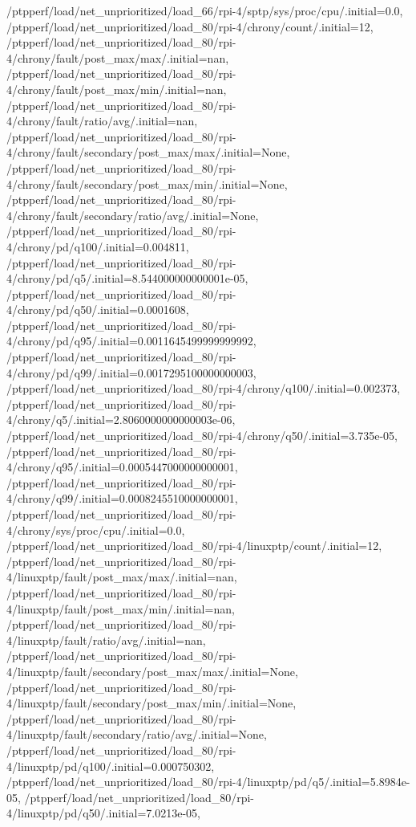 {    /ptpperf/load/net_unprioritized/load_66/rpi-4/sptp/sys/proc/cpu/.initial=0.0,
    /ptpperf/load/net_unprioritized/load_80/rpi-4/chrony/count/.initial=12,
    /ptpperf/load/net_unprioritized/load_80/rpi-4/chrony/fault/post_max/max/.initial=nan,
    /ptpperf/load/net_unprioritized/load_80/rpi-4/chrony/fault/post_max/min/.initial=nan,
    /ptpperf/load/net_unprioritized/load_80/rpi-4/chrony/fault/ratio/avg/.initial=nan,
    /ptpperf/load/net_unprioritized/load_80/rpi-4/chrony/fault/secondary/post_max/max/.initial=None,
    /ptpperf/load/net_unprioritized/load_80/rpi-4/chrony/fault/secondary/post_max/min/.initial=None,
    /ptpperf/load/net_unprioritized/load_80/rpi-4/chrony/fault/secondary/ratio/avg/.initial=None,
    /ptpperf/load/net_unprioritized/load_80/rpi-4/chrony/pd/q100/.initial=0.004811,
    /ptpperf/load/net_unprioritized/load_80/rpi-4/chrony/pd/q5/.initial=8.544000000000001e-05,
    /ptpperf/load/net_unprioritized/load_80/rpi-4/chrony/pd/q50/.initial=0.0001608,
    /ptpperf/load/net_unprioritized/load_80/rpi-4/chrony/pd/q95/.initial=0.0011645499999999992,
    /ptpperf/load/net_unprioritized/load_80/rpi-4/chrony/pd/q99/.initial=0.0017295100000000003,
    /ptpperf/load/net_unprioritized/load_80/rpi-4/chrony/q100/.initial=0.002373,
    /ptpperf/load/net_unprioritized/load_80/rpi-4/chrony/q5/.initial=2.8060000000000003e-06,
    /ptpperf/load/net_unprioritized/load_80/rpi-4/chrony/q50/.initial=3.735e-05,
    /ptpperf/load/net_unprioritized/load_80/rpi-4/chrony/q95/.initial=0.0005447000000000001,
    /ptpperf/load/net_unprioritized/load_80/rpi-4/chrony/q99/.initial=0.0008245510000000001,
    /ptpperf/load/net_unprioritized/load_80/rpi-4/chrony/sys/proc/cpu/.initial=0.0,
    /ptpperf/load/net_unprioritized/load_80/rpi-4/linuxptp/count/.initial=12,
    /ptpperf/load/net_unprioritized/load_80/rpi-4/linuxptp/fault/post_max/max/.initial=nan,
    /ptpperf/load/net_unprioritized/load_80/rpi-4/linuxptp/fault/post_max/min/.initial=nan,
    /ptpperf/load/net_unprioritized/load_80/rpi-4/linuxptp/fault/ratio/avg/.initial=nan,
    /ptpperf/load/net_unprioritized/load_80/rpi-4/linuxptp/fault/secondary/post_max/max/.initial=None,
    /ptpperf/load/net_unprioritized/load_80/rpi-4/linuxptp/fault/secondary/post_max/min/.initial=None,
    /ptpperf/load/net_unprioritized/load_80/rpi-4/linuxptp/fault/secondary/ratio/avg/.initial=None,
    /ptpperf/load/net_unprioritized/load_80/rpi-4/linuxptp/pd/q100/.initial=0.000750302,
    /ptpperf/load/net_unprioritized/load_80/rpi-4/linuxptp/pd/q5/.initial=5.8984e-05,
    /ptpperf/load/net_unprioritized/load_80/rpi-4/linuxptp/pd/q50/.initial=7.0213e-05,
}
